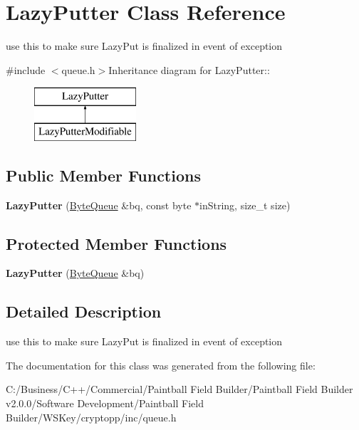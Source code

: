 \hypertarget{class_lazy_putter}{
\section{LazyPutter Class Reference}
\label{class_lazy_putter}
}


use this to make sure LazyPut is finalized in event of exception  


{\ttfamily \#include $<$queue.h$>$}Inheritance diagram for LazyPutter::\begin{figure}[H]
\begin{center}
\leavevmode
\includegraphics[height=2cm]{class_lazy_putter}
\end{center}
\end{figure}
\subsection*{Public Member Functions}
\begin{DoxyCompactItemize}
\item 
\hypertarget{class_lazy_putter_ab58defac094b33fccec649873f8707eb}{
{\bfseries LazyPutter} (\hyperlink{class_byte_queue}{ByteQueue} \&bq, const byte $\ast$inString, size\_\-t size)}
\label{class_lazy_putter_ab58defac094b33fccec649873f8707eb}

\end{DoxyCompactItemize}
\subsection*{Protected Member Functions}
\begin{DoxyCompactItemize}
\item 
\hypertarget{class_lazy_putter_a12abfc66b854b744c9479c370b26c902}{
{\bfseries LazyPutter} (\hyperlink{class_byte_queue}{ByteQueue} \&bq)}
\label{class_lazy_putter_a12abfc66b854b744c9479c370b26c902}

\end{DoxyCompactItemize}


\subsection{Detailed Description}
use this to make sure LazyPut is finalized in event of exception 

The documentation for this class was generated from the following file:\begin{DoxyCompactItemize}
\item 
C:/Business/C++/Commercial/Paintball Field Builder/Paintball Field Builder v2.0.0/Software Development/Paintball Field Builder/WSKey/cryptopp/inc/queue.h\end{DoxyCompactItemize}
